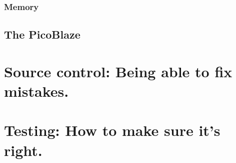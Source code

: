 \documentclass[12pt,a4paper]{article}
\begin{document}


\subsubsection{Memory}

\pagebreak
\subsection{The PicoBlaze}

\pagebreak
\section{Source control: Being able to fix mistakes.}

\pagebreak
\section{Testing: How to make sure it's right.}
\end{document}
